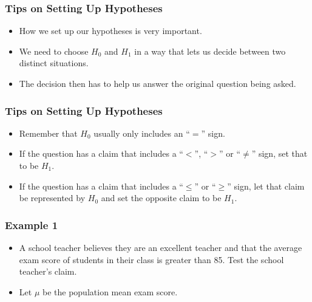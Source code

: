 \documentclass[12pt]{beamer}
\begin{document}
\begin{frame}
	\frametitle{Tips on Setting Up Hypotheses}
	
	\begin{itemize}[label={\color{blue}$\blacktriangleright$}]
		\item How we set up our hypotheses is very important.
		
		\item We need to choose $H_0$ and $H_1$ in a way that lets us decide between two distinct situations.
		
		\item The decision then has to help us answer the original question being asked.
	\end{itemize}
	
\end{frame}
\begin{frame}
	\frametitle{Tips on Setting Up Hypotheses}
	
	\begin{itemize}[label={\color{blue}$\blacktriangleright$}]
		\item Remember that $H_0$ usually only includes an ``$=$'' sign.
		
		\item If the question has a claim that includes a ``$<$'', ``$>$'' or ``$\neq$'' sign, set that to be $H_1$.
		
		\item If the question has a claim that includes a ``$\leq$'' or ``$\geq$'' sign, let that claim be represented by $H_0$ and set the opposite claim to be $H_1$.
	\end{itemize}
	
\end{frame}
\begin{frame}
	\frametitle{Example 1}
	
	\begin{itemize}[label={\color{blue}$\blacktriangleright$}]
		\item A school teacher believes they are an excellent teacher and that the average exam score of students in their class is greater than 85. Test the school teacher's claim.
		
		\item Let $\mu$ be the population mean exam score.
	\end{itemize}
	
\end{frame}
\end{document}

